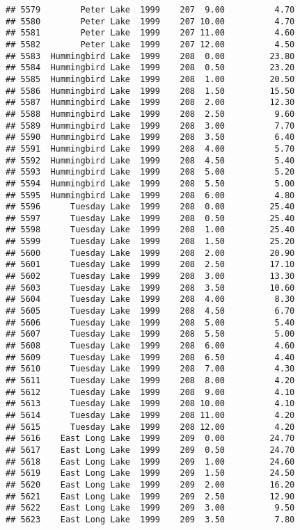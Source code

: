\documentclass[
]{article}
\begin{document}
\begin{verbatim}
## 5579        Peter Lake  1999    207  9.00          4.70
## 5580        Peter Lake  1999    207 10.00          4.70
## 5581        Peter Lake  1999    207 11.00          4.60
## 5582        Peter Lake  1999    207 12.00          4.50
## 5583  Hummingbird Lake  1999    208  0.00         23.80
## 5584  Hummingbird Lake  1999    208  0.50         23.20
## 5585  Hummingbird Lake  1999    208  1.00         20.50
## 5586  Hummingbird Lake  1999    208  1.50         15.50
## 5587  Hummingbird Lake  1999    208  2.00         12.30
## 5588  Hummingbird Lake  1999    208  2.50          9.60
## 5589  Hummingbird Lake  1999    208  3.00          7.70
## 5590  Hummingbird Lake  1999    208  3.50          6.40
## 5591  Hummingbird Lake  1999    208  4.00          5.70
## 5592  Hummingbird Lake  1999    208  4.50          5.40
## 5593  Hummingbird Lake  1999    208  5.00          5.20
## 5594  Hummingbird Lake  1999    208  5.50          5.00
## 5595  Hummingbird Lake  1999    208  6.00          4.80
## 5596      Tuesday Lake  1999    208  0.00         25.40
## 5597      Tuesday Lake  1999    208  0.50         25.40
## 5598      Tuesday Lake  1999    208  1.00         25.40
## 5599      Tuesday Lake  1999    208  1.50         25.20
## 5600      Tuesday Lake  1999    208  2.00         20.90
## 5601      Tuesday Lake  1999    208  2.50         17.10
## 5602      Tuesday Lake  1999    208  3.00         13.30
## 5603      Tuesday Lake  1999    208  3.50         10.60
## 5604      Tuesday Lake  1999    208  4.00          8.30
## 5605      Tuesday Lake  1999    208  4.50          6.70
## 5606      Tuesday Lake  1999    208  5.00          5.40
## 5607      Tuesday Lake  1999    208  5.50          5.00
## 5608      Tuesday Lake  1999    208  6.00          4.60
## 5609      Tuesday Lake  1999    208  6.50          4.40
## 5610      Tuesday Lake  1999    208  7.00          4.30
## 5611      Tuesday Lake  1999    208  8.00          4.20
## 5612      Tuesday Lake  1999    208  9.00          4.10
## 5613      Tuesday Lake  1999    208 10.00          4.10
## 5614      Tuesday Lake  1999    208 11.00          4.20
## 5615      Tuesday Lake  1999    208 12.00          4.20
## 5616    East Long Lake  1999    209  0.00         24.70
## 5617    East Long Lake  1999    209  0.50         24.70
## 5618    East Long Lake  1999    209  1.00         24.60
## 5619    East Long Lake  1999    209  1.50         24.50
## 5620    East Long Lake  1999    209  2.00         16.20
## 5621    East Long Lake  1999    209  2.50         12.90
## 5622    East Long Lake  1999    209  3.00          9.50
## 5623    East Long Lake  1999    209  3.50          7.80

\end{verbatim}
\end{document}
